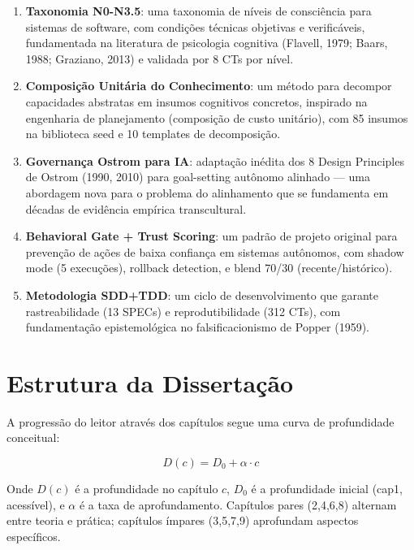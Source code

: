 \begin{enumerate}
    \item \textbf{Taxonomia N0-N3.5}: uma taxonomia de níveis de consciência para sistemas de software, com condições técnicas objetivas e verificáveis, fundamentada na literatura de psicologia cognitiva (Flavell, 1979; Baars, 1988; Graziano, 2013) e validada por 8 CTs por nível.
    \item \textbf{Composição Unitária do Conhecimento}: um método para decompor capacidades abstratas em insumos cognitivos concretos, inspirado na engenharia de planejamento (composição de custo unitário), com 85 insumos na biblioteca seed e 10 templates de decomposição.
    \item \textbf{Governança Ostrom para IA}: adaptação inédita dos 8 Design Principles de Ostrom (1990, 2010) para goal-setting autônomo alinhado — uma abordagem nova para o problema do alinhamento que se fundamenta em décadas de evidência empírica transcultural.
    \item \textbf{Behavioral Gate + Trust Scoring}: um padrão de projeto original para prevenção de ações de baixa confiança em sistemas autônomos, com shadow mode (5 execuções), rollback detection, e blend 70/30 (recente/histórico).
    \item \textbf{Metodologia SDD+TDD}: um ciclo de desenvolvimento que garante rastreabilidade (13 SPECs) e reprodutibilidade (312 CTs), com fundamentação epistemológica no falsificacionismo de Popper (1959).
\end{enumerate}

\section{Estrutura da Dissertação}

A progressão do leitor através dos capítulos segue uma curva de profundidade conceitual:

\begin{equation}
D(c) = D_0 + \alpha \cdot c
\label{eq:profundidade}
\end{equation}

Onde $D(c)$ é a profundidade no capítulo $c$, $D_0$ é a profundidade inicial (cap1, acessível), e $\alpha$ é a taxa de aprofundamento. Capítulos pares (2,4,6,8) alternam entre teoria e prática; capítulos ímpares (3,5,7,9) aprofundam aspectos específicos.

